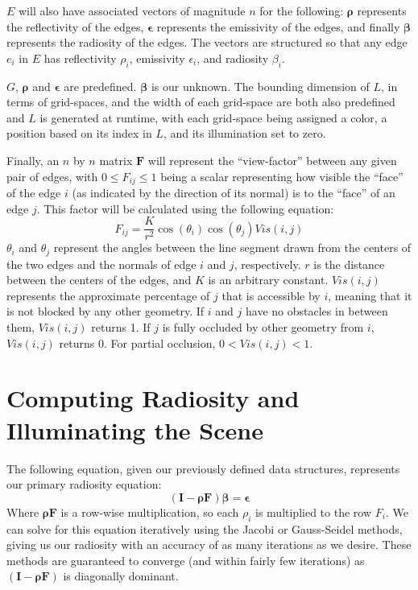 \documentclass{article}
\newcommand{\vect}[1]{\boldsymbol{#1}}
\begin{document}
$E$ will also have associated vectors of magnitude $n$ for the following: $\vect{\rho}$ represents the reflectivity of the edges, $\vect{\epsilon}$ represents the emissivity of the edges, and finally $\vect{β}$ represents the radiosity of the edges. The vectors are structured so that any edge $e_i$ in $E$ has reflectivity $\rho_i$, emissivity $\epsilon_i$, and radiosity $\beta_i$.

$G$, $\vect{\rho}$ and $\vect{\epsilon}$ are predefined. $\vect{\beta}$ is our unknown. The bounding dimension of $L$, in terms of grid-spaces, and the width of each grid-space are both also predefined and $L$ is generated at runtime, with each grid-space being assigned a color, a position based on its index in $L$, and its illumination set to zero.

Finally, an $n$ by $n$ matrix $\vect{F}$ will represent the “view-factor” between any given pair of edges, with $0\leq F_{ij}\leq1$ being a scalar representing how visible the “face” of the edge $i$ (as indicated by the direction of its normal) is to the “face” of an edge $j$. This factor will be calculated using the following equation:
\begin{equation}
F_{ij}=\frac{K}{r^2}\cos(\theta_i)\cos(\theta_j)Vis(i, j)
\end{equation}
$\theta_i$ and $\theta_j$ represent the angles between the line segment drawn from the centers of the two edges and the normals of edge $i$ and $j$, respectively. $r$ is the distance between the centers of the edges, and $K$ is an arbitrary constant. $Vis(i, j)$ represents the approximate percentage of $j$ that is accessible by $i$, meaning that it is not blocked by any other geometry. If $i$ and $j$ have no obstacles in between them, $Vis(i, j)$ returns 1. If $j$ is fully occluded by other geometry from $i$, $Vis(i, j)$ returns 0. For partial occlusion, $0<Vis(i,j)<1$.

\section{Computing Radiosity and Illuminating the Scene}
The following equation, given our previously defined data structures, represents our primary radiosity equation:
\begin{equation}
(\vect{I}-\vect{\rho} \vect{F})\vect{\beta}=\vect{\epsilon}
\end{equation}
Where $\vect{\rho}\vect{F}$ is a row-wise multiplication, so each $\rho_i$ is multiplied to the row $F_i$. We can solve for this equation iteratively using the Jacobi or Gauss-Seidel methods, giving us our radiosity with an accuracy of as many iterations as we desire. These methods are guaranteed to converge (and within fairly few iterations) as $(\vect{I}-\vect{\rho}\vect{F})$ is diagonally dominant.
\end{document}
